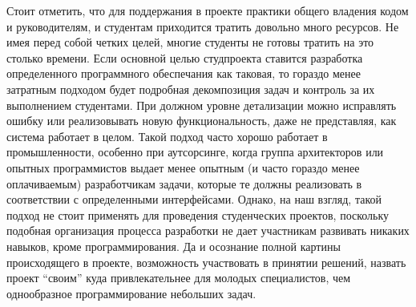 \documentclass[a4paper]{article}
\begin{document}
Стоит отметить, что для поддержания в проекте практики общего владения кодом и руководителям, и студентам приходится тратить довольно много ресурсов. Не имея перед собой четких целей, многие студенты не готовы тратить на это столько времени. Если основной целью студпроекта ставится разработка определенного программного обеспечания как таковая, то гораздо менее затратным подходом будет подробная декомпозиция задач и контроль за их выполнением студентами.  При должном уровне детализации можно исправлять ошибку или реализовывать новую функциональность, даже не представляя, как система работает в целом. 
Такой подход часто хорошо работает в промышленности, особенно при аутсорсинге, когда группа архитекторов или опытных программистов выдает менее опытным (и часто гораздо менее оплачиваемым) разработчикам задачи, которые те должны реализовать в соответствии с определенными интерфейсами. Однако, на наш взгляд, такой подход не стоит применять для проведения студенческих проектов, поскольку подобная организация процесса разработки не дает участникам развивать никаких навыков, кроме программирования. Да и осознание полной картины происходящего в проекте, возможность участвовать в принятии решений, назвать проект ``своим'' куда привлекательнее для молодых специалистов, чем однообразное программирование небольших задач. 
\end{document}
